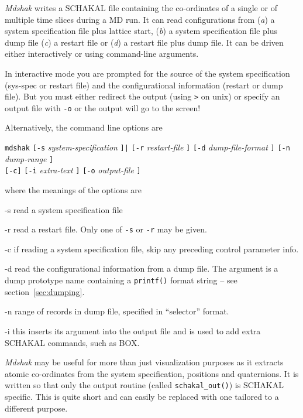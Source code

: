 \documentclass[twoside]{report}
\begin{document}
{\em Mdshak\/} writes a SCHAKAL file containing the co-ordinates of a
single or of multiple time slices during a MD run.  It can read
configurations from ({\em a\/}) a system specification file plus
lattice start,  ({\em b\/}) a system specification file plus
dump file ({\em c\/}) a restart file or ({\em d\/}) a restart file
plus dump file.   It can be driven either interactively or using
command-line arguments.  

In interactive mode you are prompted for the source of the system
specification (sys-spec or restart file) and the configurational
information (restart or dump file).  But you must either redirect the
output (using \texttt{>} on unix) or specify an output file with
\texttt{-o} or the output will go to the screen!

Alternatively, the command line options are
\begin{center}
\texttt{mdshak}
\texttt{[-s} {\em system-specification\/} \texttt{]|}%
\texttt{[-r} {\em restart-file\/} \texttt{]}
\texttt{[-d} {\em dump-file-format\/} \texttt{]}
\texttt{[-n} {\em dump-range\/} \texttt{]} \\
\texttt{[-c]}
\texttt{[-i} {\em extra-text\/} \texttt{]}
\texttt{[-o} {\em output-file} \texttt{]}
\end{center}
where the meanings of the options are
\begin{list}{}{\let\makelabel\boldlabel\itemsep=0pt\parsep=3pt\leftmargin=1.5cm}
\item[-s] read a system specification file
\item[-r] read a restart file.  Only one of \texttt{-s} or \texttt{-r} may
be given.
\item[-c] if reading a system specification file, skip any preceding
control parameter info.
\item[-d] read the configurational information from a dump file.  The
argument is a dump prototype name containing a \texttt{printf()} format
string -- see section~\ref{sec:dumping}.
\item[-n] range of records in dump file, specified in ``selector''
format.
\item[-i]   this inserts its argument into the output file and is used
to add extra SCHAKAL commands, such as BOX.
\end{list}

{\em Mdshak\/} may be useful for more than just visualization purposes
as it extracts atomic co-ordinates from the system specification,
positions and quaternions.  It is written so that only the output routine
(called \texttt{schakal\_out()}) is SCHAKAL specific.  This is quite
short and can easily be replaced with one tailored to a different
purpose.



\end{document}
